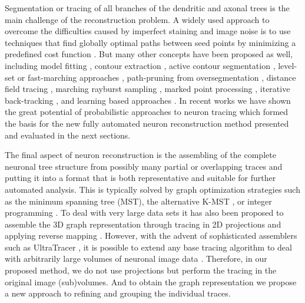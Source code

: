 Segmentation or tracing of all branches of the dendritic and axonal trees is the main challenge of the reconstruction problem. A widely used approach to overcome the difficulties caused by imperfect staining and image noise is to use techniques that find globally optimal paths between seed points by minimizing a predefined cost function \citep{meijering2004design, peng2011automatic, longair2011simple, quan2016neurogps}. But many other concepts have been proposed as well, including model fitting \citep{schmitt2004new,zhao2011automated}, contour extraction \citep{leandro2009automatic}, active contour segmentation \citep{wang2011broadly, luo2015neuron}, level-set or fast-marching approaches \citep{xiao2013app2, basu2014reconstructing}, path-pruning from oversegmentation \citep{peng2011automatic}, distance field tracing \citep{yang2013distance}, marching rayburst sampling \citep{ming2013rapid}, marked point processing \citep{basu2016neurite}, iterative back-tracking \citep{liu2016rivulet}, and learning based approaches \citep{chen2015smarttracing, gala2014active, santamaria2015automatic}. In recent works we have shown the great potential of probabilistic approaches to neuron tracing \citep{radojevic2015automated, radojevic2017automated, radojevic2017neuron} which formed the basis for the new fully automated neuron reconstruction method presented and evaluated in the next sections.

The final aspect of neuron reconstruction is the assembling of the complete neuronal tree structure from possibly many partial or overlapping traces and putting it into a format that is both representative and suitable for further automated analysis. This is typically solved by graph optimization strategies such as the minimum spanning tree (MST), the alternative K-MST \citep{turetken2011automated, gonzalez2010delineating}, or integer programming \citep{turetken2013reconstructing}. To deal with very large data sets it has also been proposed to assemble the 3D graph representation through tracing in 2D projections and applying reverse mapping \citep{zhou2016tremap}. However, with the advent of sophisticated assemblers such as UltraTracer \citep{peng2016automatic}, it is possible to extend any base tracing algorithm to deal with arbitrarily large volumes of neuronal image data \citep{peng2016automatic}. Therefore, in our proposed method, we do not use projections but perform the tracing in the original image (sub)volumes. And to obtain the graph representation we propose a new approach to refining and grouping the individual traces.

